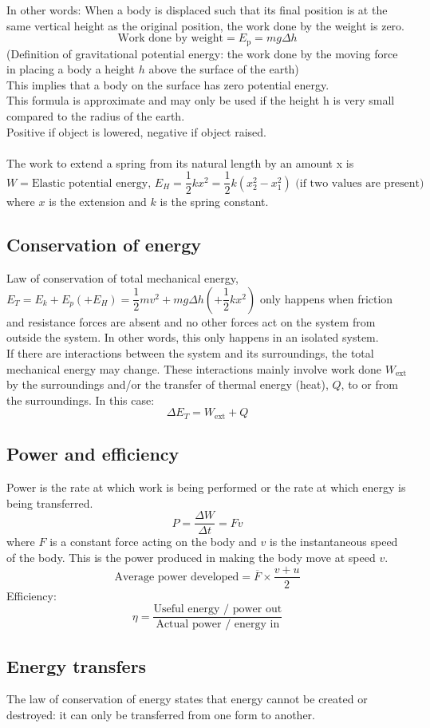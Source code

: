 In other words: When a body is displaced such that its final position is at the same vertical height as the original position, the work done by the weight is zero.
\[\text{Work done by weight}=E_\text{p}=mg\Delta h\]
(Definition of gravitational potential energy: the work done by the moving force in placing a body a height $h$ above the surface of the earth)\\
This implies that a body on the surface has zero potential energy.\\
This formula is approximate and may only be used if the height h is very small compared to the radius of the earth.\\
Positive if object is lowered, negative if object raised.\\\\
The work to extend a spring from its natural length by an amount x is
\[W=\text{Elastic potential energy, } E_H=\dfrac{1}{2}kx^2=\dfrac{1}{2}k(x_2^2-x_1^2) \text{ (if two values are present)}\]
where $x$ is the extension and $k$ is the spring constant.
\subsection{Conservation of energy}
Law of conservation of total mechanical energy, $E_T=E_k+E_p(+E_H)=\dfrac{1}{2}mv^2+mg\Delta h\left(+\dfrac{1}{2}kx^2\right)$ only happens when friction and resistance forces are absent and no other forces act on the system from outside the system. In other words, this only happens in an isolated system.\\
If there are interactions between the system and its surroundings, the total mechanical energy may change. These interactions mainly involve work done $W_\text{ext}$ by the surroundings and/or the transfer of thermal energy (heat), $Q$, to or from the surroundings. In this case:
\[\Delta E_T=W_\text{ext} + Q\]
\subsection{Power and efficiency}
Power is the rate at which work is being performed or the rate at which energy is being transferred.
\[P=\dfrac{\Delta W}{\Delta t}=Fv\]
where $F$ is a constant force acting on the body and $v$ is the instantaneous speed of the body. This is the power produced in making the body move at speed $v$.
\[\text{Average power developed}=\overline{F}\times\dfrac{v+u}{2}\]
Efficiency:
\[\eta=\dfrac{\text{Useful energy / power out}}{\text{Actual power / energy in}}\]
\subsection{Energy transfers}
The law of conservation of energy states that energy cannot be created or destroyed: it can only be transferred from one form to another.
